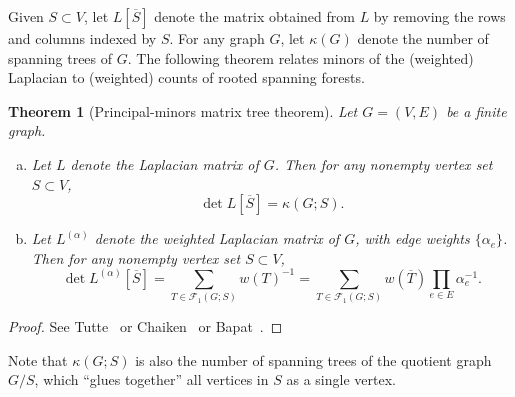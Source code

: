 \documentclass{amsart}
\newtheorem{thm}{Theorem}[section]
\theoremstyle{definition}
\newtheorem{dfn}[thm]{Definition}
\newcommand{\RR}{\mathbb{R}}
\newcommand{\La}{L^{(\alpha)}}
\newcommand{\trees}{\mathcal{F}_1}
\begin{document}

Given $S \subset V$,
let $L[\overline S]$ denote the matrix obtained from $L$ by removing the rows and columns indexed by $S$.
For any graph $G$, let $\kappa(G)$ denote the number of spanning trees of $G$.
The following theorem relates minors of the (weighted) Laplacian to (weighted) counts of rooted spanning forests.
\begin{thm}[Principal-minors matrix tree theorem]
\label{thm:matrix-tree}
Let $G = (V,E)$ be a finite graph.
\begin{enumerate}[(a)]
\item 
Let $L$ denote the Laplacian matrix of $G$.
Then for any nonempty vertex set $S \subset V$,
\begin{equation}
	\det L[\overline S] = \kappa( G ; S) .
\end{equation}

\item 
Let $\La$ denote the weighted Laplacian matrix of $G$, with edge weights $\{\alpha_e\}$. 
Then for any nonempty vertex set $S \subset V$,
\begin{equation}
	\det \La[\overline S] = \sum_{T \in \trees( G ; S)} w(T)^{-1}
	= \sum_{T \in \trees(G; S)} w(\overline{T}) \prod_{e \in E} \alpha_e^{-1} .
\end{equation}
\end{enumerate}
\end{thm}
\begin{proof}
See Tutte~\cite[Section VI.6, Equation (VI.6.7)]{tutte} or Chaiken~\cite{chaiken} or Bapat~\cite[Theorem 4.7]{bapat}.
\end{proof}

Note that $\kappa(G;S)$ is also the number of 
spanning trees of the quotient graph $G / S$, which ``glues together'' all vertices in $S$ as a single vertex.
\end{document}
